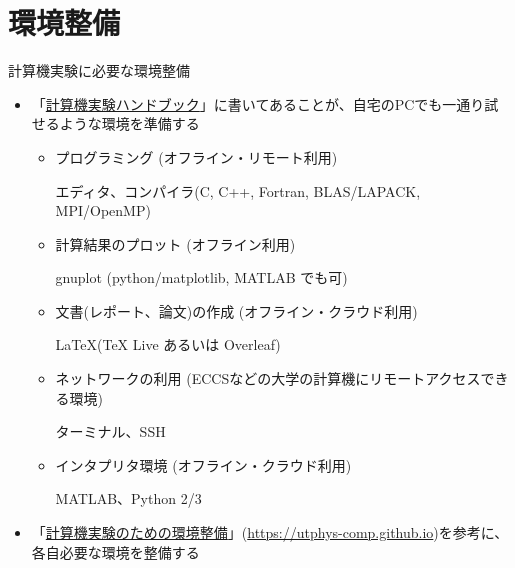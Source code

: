 \section{環境整備}

\begin{frame}[t,fragile]{計算機実験に必要な環境整備}
  \begin{itemize}
  \item 「\href{https://github.com/utphys-comp/handbook/releases/download/handbook-2021/handbook.pdf}{計算機実験ハンドブック}」に書いてあることが、自宅のPCでも一通り試せるような環境を準備する
    \begin{itemize}
    \item プログラミング (オフライン・リモート利用)

      エディタ、コンパイラ(C, C++, Fortran, BLAS/LAPACK, MPI/OpenMP)
    \item 計算結果のプロット (オフライン利用)

      gnuplot (python/matplotlib, MATLAB でも可)
    \item 文書(レポート、論文)の作成 (オフライン・クラウド利用)

      \LaTeX (TeX Live あるいは Overleaf)
    \item ネットワークの利用 (ECCSなどの大学の計算機にリモートアクセスできる環境)

      ターミナル、SSH
    \item インタプリタ環境 (オフライン・クラウド利用)

      MATLAB、Python 2/3
    \end{itemize}
  \item 「\href{https://utphys-comp.github.io}{計算機実験のための環境整備}」({\small \href{https://utphys-comp.github.io}{https://utphys-comp.github.io}})を参考に、各自必要な環境を整備する
  \end{itemize}
\end{frame}


